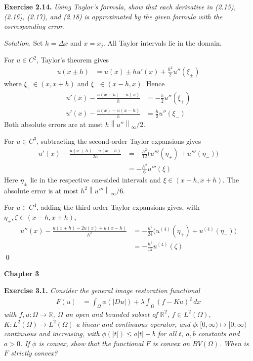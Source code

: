 \documentclass[12pt,letterpaper]{article}
\newcommand{\norm}[1]{\left\lVert #1\right\rVert}
\newcommand{\exercise}[1]{%
  \par\bigskip\noindent\textbf{Exercise #1.}\enspace}
\newenvironment{statement}{\itshape\ignorespaces}{\par}
\newcommand{\solution}{\par\medskip\noindent\textit{Solution.}\enspace}
\newcommand{\finish}{\qed\par}
\begin{document}
\clearpage
\begin{samepage}
\exercise{2.14}
\begin{statement}
Using Taylor's formula, show that each derivative in (2.15), (2.16), (2.17), and (2.18) is approximated by the given formula with the corresponding error.
\end{statement}
\end{samepage}
\solution
Set $h=\Delta x$ and $x=x_j$. All Taylor intervals lie in the domain.

For $u\in C^2$, Taylor's theorem gives
\begin{align*}
 u(x\pm h)&=u(x)\pm hu'(x)+\frac{h^2}{2}u''(\xi_\pm)
\end{align*}
where $\xi_+\in(x,x+h)$ and $\xi_-\in(x-h,x)$. Hence
\begin{align*}
 u'(x)-\frac{u(x+h)-u(x)}h&=-\frac h2u''(\xi_+)\\
 u'(x)-\frac{u(x)-u(x-h)}h&=\frac h2u''(\xi_-)
\end{align*}
Both absolute errors are at most $h\norm{u''}_\infty/2$.

For $u\in C^3$, subtracting the second-order Taylor expansions gives
\begin{align*}
 u'(x)-\frac{u(x+h)-u(x-h)}{2h}
 &=-\frac{h^2}{12}\bigl(u'''(\eta_+)+u'''(\eta_-)\bigr)\\
 &=-\frac{h^2}{6}u'''(\xi)
\end{align*}
Here $\eta_\pm$ lie in the respective one-sided intervals and
$\xi\in(x-h,x+h)$. The absolute error is at most
$h^2\norm{u'''}_\infty/6$.

For $u\in C^4$, adding the third-order Taylor expansions gives,
with $\eta_\pm,\zeta\in(x-h,x+h)$,
\begin{align*}
 u''(x)-\frac{u(x+h)-2u(x)+u(x-h)}{h^2}
 &=-\frac{h^2}{24}\bigl(u^{(4)}(\eta_+)+u^{(4)}(\eta_-)\bigr)\\
 &=-\frac{h^2}{12}u^{(4)}(\zeta)
\end{align*}
\finish


\clearpage
{}
\begin{center}
\textbf{Chapter 3}
\end{center}

\begin{samepage}
\exercise{3.1}
\begin{statement}
Consider the general image restoration functional
\begin{align*}
 F(u)&=\int_\Omega\phi(|Du|)+\lambda\int_\Omega(f-Ku)^2\,dx
 \tag{3.18}
\end{align*}
with $f,u:\Omega\to\mathbb R$, $\Omega$ an open and bounded subset
of $\mathbb R^2$, $f\in L^2(\Omega)$,
$K:L^2(\Omega)\to L^2(\Omega)$ a linear and continuous operator,
and $\phi:[0,\infty)\mapsto[0,\infty)$ continuous and increasing,
with $\phi(|t|)\le a|t|+b$ for all $t$, $a,b$ constants and $a>0$.
If $\phi$ is convex, show that the functional $F$ is convex on
$BV(\Omega)$. When is $F$ strictly convex?
\end{statement}
\end{samepage}
\end{document}
